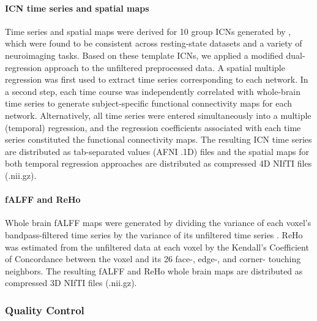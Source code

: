 \documentclass[preprint,12pt,3p]{elsarticle}
\begin{document}
\paragraph{ICN time series and spatial maps} Time series and spatial maps were derived for 10 group ICNs generated by \cite{smith2009correspondence}, which were found to be consistent across resting-state datasets and a variety of neuroimaging tasks. Based on these template ICNs, we applied a modified dual-regression approach \cite{Beckmann2009dualreg} to the unfiltered preprocessed data. A spatial multiple regression was first used to extract time series corresponding to each network. In a second step, each time course was independently correlated with whole-brain time series to generate subject-specific functional connectivity maps for each network. Alternatively, all time series were entered simultaneously into a multiple (temporal) regression, and the regression coefficients associated with each time series constituted the functional connectivity maps. The resulting ICN time series are distributed as tab-separated values (AFNI .1D) files and the spatial maps for both temporal regression approaches are distributed as compressed 4D NIfTI files (.nii.gz).

\paragraph{fALFF and ReHo} Whole brain fALFF maps were generated by dividing the variance of each voxel's bandpass-filtered time series by the variance of its unfiltered time series \cite{zuo2008falff}. ReHo was estimated from the unfiltered data at each voxel by the Kendall's Coefficient of Concordance \cite{kendall1939w} between the voxel and its 26 face-, edge-, and corner- touching neighbors. The resulting fALFF and ReHo whole brain maps are distributed as compressed 3D NIfTI files (.nii.gz).

\subsubsection{Quality Control} 
\end{document}
